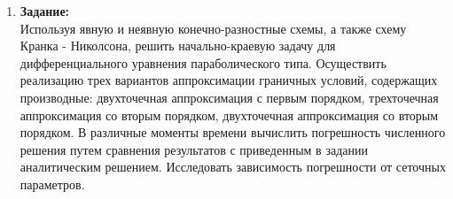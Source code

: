\documentclass[12pt]{article}
\begin{document}
    \pagestyle{fancy} 
        \fancyhead{}
    \fancyfoot{} 
    \begin{enumerate}
        \item \textbf{Задание:}\\
        Используя явную и неявную конечно-разностные схемы, а также схему Кранка - Николсона, решить начально-краевую задачу для дифференциального уравнения параболического типа. Осуществить реализацию трех вариантов аппроксимации граничных условий, содержащих производные: двухточечная аппроксимация с первым порядком, трехточечная аппроксимация со вторым порядком, двухточечная аппроксимация со вторым порядком. В различные моменты времени вычислить погрешность численного решения путем сравнения результатов с приведенным в задании аналитическим решением. Исследовать зависимость погрешности от сеточных параметров.


\end{enumerate}
\end{document}
